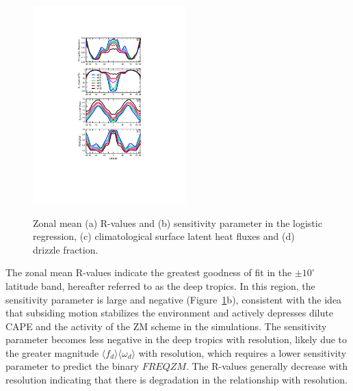 \documentclass[times]{qjrms4}
\begin{document}
\begin{figure}
\begin{center}
\noindent\includegraphics[width=14pc,angle=0]{figs/temp_4zonal.pdf}\\
\end{center}
\caption{Zonal mean (a) R-values and (b) sensitivity parameter in the logistic regression, (c) climatological surface latent heat fluxes and (d) drizzle fraction.}
\label{fig:4zonal}
\end{figure}

The zonal mean R-values indicate the greatest goodness of fit in the $\pm 10^{\circ}$ latitude band, hereafter referred to as the deep tropics. In this region, the sensitivity parameter is large and negative (Figure~\ref{fig:4zonal}b), consistent with the idea that subsiding motion stabilizes the environment and actively depresses dilute CAPE and the activity of the ZM scheme in the simulations. The sensitivity parameter becomes less negative in the deep tropics with resolution, likely due to the greater magnitude $\langle f_{d} \rangle \langle \omega_{d} \rangle$ with resolution, which requires a lower sensitivity parameter to predict the binary $FREQZM$. The R-values generally decrease with resolution indicating that there is degradation in the relationship with resolution.
\end{document}
